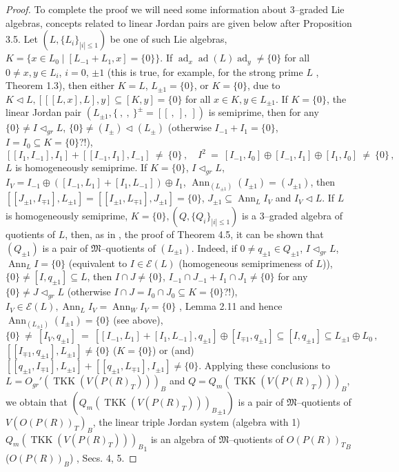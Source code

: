 \documentclass[a4paper,11pt]{article}
\DeclareMathOperator{\ad}{ad}
\DeclareMathOperator{\Ann}{Ann}
\DeclareMathOperator{\TKK}{TKK}
\begin{document}
\begin{proof}
To complete the proof we will 
need some information about $3$--graded Lie algebras, concepts related to 
linear Jordan pairs are given below after Proposition 3.5. Let 
${(L, \{L_i\}_{|i|\leq 1})}$ be one of such Lie algebras, 
${K=\{x\in L_0\mid [L_{-1}+L_1, x]=\{0\}\}}$. If 
${\ad_x \ad(L) \ad_y\ne \{0\}}$ for all ${0\ne x, y\in L_i}$, 
${i=0}$, ${\pm 1}$ (this is true, for example, for the strong prime 
$L$ \cite{GK}, Theorem 1.3), then either ${K=L}$, 
${L_{\pm 1}=\{0\}}$, or ${K=\{0\}}$, due to 
${K\lhd L, [[[L, x], L], y]\subseteq [K, y]=\{0\}}$ for all 
${x\in K, y\in L_{\pm 1}}$. If ${K=\{0\}}$, the linear Jordan pair 
${(L_{\pm 1}, \{\ ,\ ,\ \}^{\pm}=[[\ ,\ ],\ ])}$ is semi\-prime, then for any 
${\{0\}\ne I\lhd_{gr} L}$, ${\{0\}\ne (I_{\pm})\lhd (L_{\pm})}$ 
(otherwise ${I_{-1}+I_1=\{0\}}$, $I=I_0\subseteq K=\{0\}$?!),
\[
[[I_1, I_{-1}], I_1]+[[I_{-1}, I_1], I_{-1}]\ \ne\ \{0\}\,,\quad 
I^2\ =\ [I_{-1}, I_0]\oplus [I_{-1}, I_1]\oplus [I_1, I_0]\ \ne\ \{0\}\,,
\] 
$L$ is homogeneously semiprime. If ${K=\{0\}}$, ${I\lhd_{gr} L}$, 
${I_V=I_{-1}\oplus ([I_{-1}, L_1]+[I_1, L_{-1}])\oplus I_1}$, 
${\Ann_{(L_{\pm 1})} (I_{\pm 1})=(J_{\pm 1})}$, then 
${[[J_{\pm 1}, I_{\mp 1}], L_{\pm 1}]=
[[I_{\pm 1}, L_{\mp 1}], J_{\pm 1}]=\{0\}}$,  
${J_{\pm 1}\subseteq \Ann_L I_V}$ and ${I_V\lhd L}$.
If $L$ is homogeneously semiprime, ${K=\{0\}, 
(Q, \{Q_i\}_{|i|\leq 1})}$ is a $3$--graded algebra of quotients of $L$, 
then, as in \cite{OMol}, the proof of Theorem 4.5, it can be shown that 
$(Q_{\pm 1})$ is a pair of $\mathfrak{M}$--quotients of $(L_{\pm 1})$. 
Indeed, if ${0\ne q_{\pm 1}\in Q_{\pm 1}}$, ${I\lhd_{gr} L}$, 
${\Ann_L I=\{0\}}$ (equivalent to ${I\in \mathcal{E}(L)}$ (homogeneous 
semiprimeness of $L$)), ${\{0\}\ne [I, q_{\pm 1}]\subseteq L}$, then 
${I\cap J\ne \{0\}}$, ${I_{-1}\cap J_{-1}+I_1\cap J_1\ne \{0\}}$ for any 
${\{0\}\ne J\lhd_{gr} L}$ 
(otherwise ${I\cap J=I_0\cap J_0\subseteq K=\{0\}}$?!), 
${I_V\in \mathcal{E}(L), \Ann_L I_V=\Ann_W I_V=\{0\}}$ 
\cite{Mol}, Lemma 2.11 and hence 
${\Ann_{(L_{\pm 1})} (I_{\pm 1})=\{0\}}$ (see above), 
\[
\{0\}\ \ne\ [I_V, q_{\pm 1}]\ =\ [[I_{-1}, L_1]+[I_1, L_{-1}], q_{\pm 1}]\oplus 
[I_{\mp 1}, q_{\pm 1}]\subseteq [I, q_{\pm 1}]\subseteq L_{\pm 1}\oplus L_0\,,
\] 
${[[I_{\mp 1}, q_{\pm 1}], L_{\pm 1}]\ne \{0\}}$ (${K=\{0\}}$) or (and) 
${[[q_{\pm 1}, I_{\mp 1}], L_{\pm 1}]+[[q_{\pm 1}, L_{\mp 1}], I_{\pm 1}]\ne 
\{0\}}$. Applying these conclusions to ${L=O_{gr}'(\TKK(V(P(R)_T)))_B}$ and 
${Q=Q_m(\TKK(V(P(R)_T)))_B}$, we obtain that 
${({Q_m(\TKK(V(P(R)_T)))_B}_{\pm 1})}$ is a pair of $\mathfrak{M}$--quotients 
of $V(O(P(R))_T)_B$, the linear triple Jordan system (algebra with 1) 
${{Q_m(\TKK(V(P(R)_T)))_B}_1}$ is an algebra of $\mathfrak{M}$--quotients 
of ${O(P(R))_T}_B$ ($O(P(R))_B$) \cite{JMQ}, Secs. 4, 5.
\end{proof}
\end{document}
